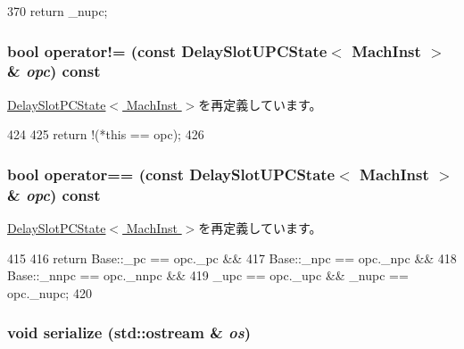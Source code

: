 \begin{DoxyCode}
370 { return _nupc; }
\end{DoxyCode}
\hypertarget{classGenericISA_1_1DelaySlotUPCState_a62dd495435f7d310779afd1c1a0b42c6}{
\subsubsection[{operator!=}]{\setlength{\rightskip}{0pt plus 5cm}bool operator!= (const {\bf DelaySlotUPCState}$<$ MachInst $>$ \& {\em opc}) const}}
\label{classGenericISA_1_1DelaySlotUPCState_a62dd495435f7d310779afd1c1a0b42c6}


\hyperlink{classGenericISA_1_1DelaySlotPCState_aaa54c276268b580f71a09be1cca39cc5}{DelaySlotPCState$<$ MachInst $>$}を再定義しています。


\begin{DoxyCode}
424     {
425         return !(*this == opc);
426     }
\end{DoxyCode}
\hypertarget{classGenericISA_1_1DelaySlotUPCState_a3eaf06cc3c4e66eb1d29bafe9d140a8c}{
\subsubsection[{operator==}]{\setlength{\rightskip}{0pt plus 5cm}bool operator== (const {\bf DelaySlotUPCState}$<$ MachInst $>$ \& {\em opc}) const}}
\label{classGenericISA_1_1DelaySlotUPCState_a3eaf06cc3c4e66eb1d29bafe9d140a8c}


\hyperlink{classGenericISA_1_1DelaySlotPCState_ac87333e7d41d689a69647582933c9985}{DelaySlotPCState$<$ MachInst $>$}を再定義しています。


\begin{DoxyCode}
415     {
416         return Base::_pc == opc._pc &&
417                Base::_npc == opc._npc &&
418                Base::_nnpc == opc._nnpc &&
419                _upc == opc._upc && _nupc == opc._nupc;
420     }
\end{DoxyCode}
\hypertarget{classGenericISA_1_1DelaySlotUPCState_a53e036786d17361be4c7320d39c99b84}{
\subsubsection[{serialize}]{\setlength{\rightskip}{0pt plus 5cm}void serialize (std::ostream \& {\em os})}}
\label{classGenericISA_1_1DelaySlotUPCState_a53e036786d17361be4c7320d39c99b84}


